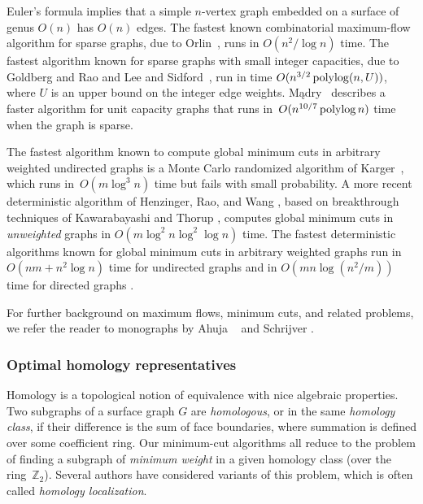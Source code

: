 \documentclass[letterpaper,review]{siamart190516}
\def\Z{\mathbb{Z}}
\begin{document}
Euler's formula implies that a simple $n$-vertex graph embedded on a surface of genus $O(n)$ has $O(n)$ edges.
The fastest known combinatorial maximum-flow algorithm for sparse graphs, due to Orlin~\cite{o-mfotl-13}, runs in $O(n^2 / \log n)$ time.
The fastest algorithm known for sparse graphs with small integer capacities, due to Goldberg and Rao
\cite{gr-bfdb-98} and Lee and Sidford~\cite{ls-pfmlp-14}, run in time $O(n^{3/2} \operatorname{polylog}(n, U))$, where $U$ is an upper bound on the integer edge weights.
M\k{a}dry~\cite{m-ncpef-13} describes a faster algorithm for unit capacity graphs that runs
in~$O(n^{10/7} \operatorname{polylog} n)$ time when the graph is sparse.

The fastest algorithm known to compute global minimum cuts in arbitrary weighted undirected graphs is a Monte Carlo randomized algorithm of Karger~\cite{k-mcnlt-00}, which runs in~$O(m \log^3 n)$ time but fails with small probability. 
A more recent deterministic algorithm of Henzinger, Rao, and Wang \cite{hrw-lfpfe-17}, based on breakthrough techniques of Kawarabayashi and Thorup \cite{kt-dgmcs-15,kt-decnt-18}, computes global minimum cuts in \emph{unweighted} graphs in $O(m \log^2 n \log^2 \log n)$ time.
The fastest deterministic algorithms known for global minimum cuts in arbitrary weighted graphs run in $O(nm + n^2\log n)$ time for undirected graphs \cite{ni-cemcg-92,f-eani-94,sw-sma-97} and in $O(mn \log(n^2/m))$ time for directed graphs \cite{ho-fafmd-94}.

For further background on maximum flows, minimum cuts, and related problems, we refer the reader to monographs by Ahuja \etal\ \cite{amo-nftaa-93} and Schrijver \cite{s-cape-03}.

\subsubsection*{Optimal homology representatives}

Homology is a topological notion of equivalence with nice algebraic properties.  Two subgraphs of a surface graph $G$ are \emph{homologous}, or in the same \emph{homology class}, if their difference is the sum of face boundaries, where summation is defined over some coefficient ring.  Our minimum-cut algorithms all reduce to the problem of finding a subgraph of \emph{minimum weight} in a given homology class (over the ring~$\Z_2$).  Several  authors have considered variants of this problem, which is often called \emph{homology localization}.
\end{document}
